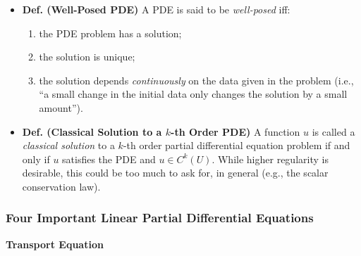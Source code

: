 \documentclass{article}
\begin{document}
\begin{itemize}
		\item \textbf{Def. (Well-Posed PDE)} A PDE is said to be \textit{well-posed} iff:  \vspace{-0.25cm}     
		\begin{enumerate}[itemsep =-2pt,label = (\roman{*})]
			\item the PDE problem has a solution; 
			\item the solution is unique; 
			\item the solution depends \textit{continuously} on the data given in the problem (i.e., ``a small change in the initial data only changes the solution by a small amount''). 
		\end{enumerate}
		
		\item \textbf{Def. (Classical Solution to a $k$-th Order PDE)} A function $u$ is called a \textit{classical solution} to a $k$-th order partial differential equation problem if and only if $u$ satisfies the PDE and $u \in C^{k}(U)$. While higher regularity is desirable, this could be too much to ask for, in general (e.g., the scalar conservation law). 
	\end{itemize}
	
	\subsubsection{Four Important Linear Partial Differential Equations}
	
	\textbf{Transport Equation}
	
\end{document}
